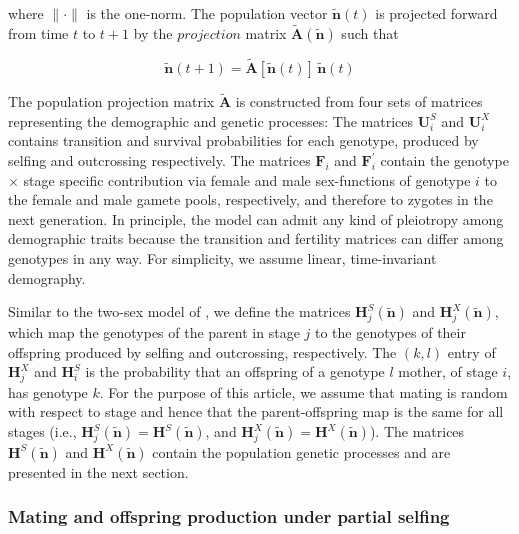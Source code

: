 \documentclass[11pt]{article}
\def\mbf#1{\mathbf{#1}}
\begin{document}
\noindent where $\| \cdot \|$ is the one-norm. The population vector $\tilde{\mbf{n}}(t)$ is projected forward from time $t$ to $t + 1$ by the $projection$ matrix $\tilde{\mbf{A}}(\tilde{\mbf{n}})$ such that 
\begin{linenomath*}
\begin{equation}
	\tilde{\mbf{n}}(t + 1) = \tilde{\mbf{A}}[\tilde{\mbf{n}}(t)] \, \tilde{\mbf{n}}(t)
\end{equation}
\end{linenomath*}

The population projection matrix $\tilde{\mbf{A}}$ is constructed from four sets of matrices representing the demographic and genetic processes: The matrices $\mbf{U}^{S}_{i}$ and $\mbf{U}^{X}_{i}$ contains transition and survival probabilities for each genotype, produced by selfing and outcrossing respectively. The matrices $\mbf{F}_{i}$ and $\mbf{F}^{\prime}_{i}$ contain the genotype $\times$ stage specific contribution via female and male sex-functions of genotype $i$ to the female and male gamete pools, respectively, and therefore to zygotes in the next generation. In principle, the model can admit any kind of pleiotropy among demographic traits because the transition and fertility matrices can differ among genotypes in any way. For simplicity, we assume linear, time-invariant demography.

Similar to the two-sex model of \citet{deVriesCaswell2019b}, we define the matrices $\mbf{H}^S_{j}(\tilde{\mbf{n}})$ and $\mbf{H}^X_{j}(\tilde{\mbf{n}})$, which map the genotypes of the parent in stage $j$ to the genotypes of their offspring produced by selfing and outcrossing, respectively. The $(k, l)$ entry of $\mbf{H}^{X}_{j}$ and $\mbf{H}^{S}_{i}$ is the probability that an offspring of a genotype $l$ mother, of stage $i$, has genotype $k$. For the purpose of this article, we assume that mating is random with respect to stage and hence that the parent-offspring map is the same for all stages (i.e., $\mbf{H}^S_{j}(\tilde{\mbf{n}}) = \mbf{H}^S(\tilde{\mbf{n}})$, and $\mbf{H}^X_{j}(\tilde{\mbf{n}}) = \mbf{H}^X(\tilde{\mbf{n}})$). The matrices $\mbf{H}^S(\tilde{\mbf{n}})$ and $\mbf{H}^X(\tilde{\mbf{n}})$ contain the population genetic processes and are presented in the next section.

\subsubsection*{Mating and offspring production under partial selfing}
\end{document}
